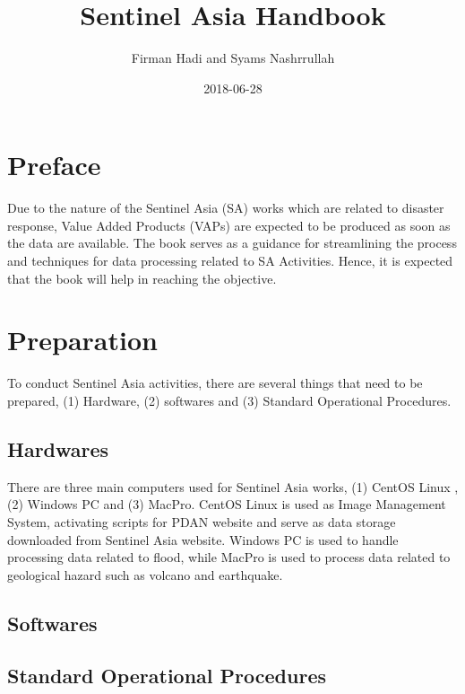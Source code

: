 \documentclass[]{book}
\title{Sentinel Asia Handbook}
\author{Firman Hadi and Syams Nashrrullah}
\date{2018-06-28}
\begin{document}
\maketitle

{
\setcounter{tocdepth}{1}
\tableofcontents
}
\chapter*{Preface}\label{preface}

Due to the nature of the Sentinel Asia (SA) works which are related to
disaster response, Value Added Products (VAPs) are expected to be
produced as soon as the data are available. The book serves as a
guidance for streamlining the process and techniques for data processing
related to SA Activities. Hence, it is expected that the book will help
in reaching the objective.

\chapter{Preparation}\label{preparation}

To conduct Sentinel Asia activities, there are several things that need
to be prepared, (1) Hardware, (2) softwares and (3) Standard Operational
Procedures.

\section{Hardwares}\label{hardwares}

There are three main computers used for Sentinel Asia works, (1) CentOS
Linux , (2) Windows PC and (3) MacPro. CentOS Linux is used as Image
Management System, activating scripts for PDAN website and serve as data
storage downloaded from Sentinel Asia website. Windows PC is used to
handle processing data related to flood, while MacPro is used to process
data related to geological hazard such as volcano and earthquake.

\section{Softwares}\label{softwares}

\section{Standard Operational
Procedures}\label{standard-operational-procedures}
\end{document}
